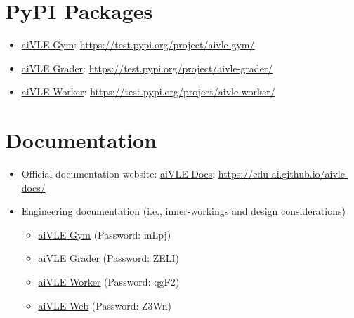 \section{PyPI Packages}
\begin{itemize}
    \item \href{https://test.pypi.org/project/aivle-gym/}{aiVLE Gym}: \href{https://test.pypi.org/project/aivle-gym/}{https://test.pypi.org/project/aivle-gym/}
    \item \href{https://test.pypi.org/project/aivle-grader/}{aiVLE Grader}: \href{https://test.pypi.org/project/aivle-grader/}{https://test.pypi.org/project/aivle-grader/}
    \item \href{https://test.pypi.org/project/aivle-worker/}{aiVLE Worker}: \href{https://test.pypi.org/project/aivle-worker/}{https://test.pypi.org/project/aivle-worker/}
\end{itemize}

\section{Documentation}
\label{as:links-documentation}
\begin{itemize}
    \item Official documentation website: \href{https://edu-ai.github.io/aivle-docs/}{aiVLE Docs}: \href{https://edu-ai.github.io/aivle-docs/}{https://edu-ai.github.io/aivle-docs/}
    \item Engineering documentation (i.e., inner-workings and design considerations)
    \begin{itemize}
        \item \href{https://yuanhong.larksuite.com/docs/docusSYdnLXZBojin39b8DGzKMT}{aiVLE Gym} (Password: mLpj)
        \item \href{https://yuanhong.larksuite.com/docs/docuseeHRJWAMV3p3uL7yYCOeYx}{aiVLE Grader} (Password: ZELI)
        \item \href{https://yuanhong.larksuite.com/docs/docussD8ik4yBXShA5kPyRGhgdg}{aiVLE Worker} (Password: qgF2)
        \item \href{https://yuanhong.larksuite.com/docs/docusfWZk1oYG8qkEMG7y2oxkye}{aiVLE Web} (Password: Z3Wn)
    \end{itemize}
\end{itemize}
